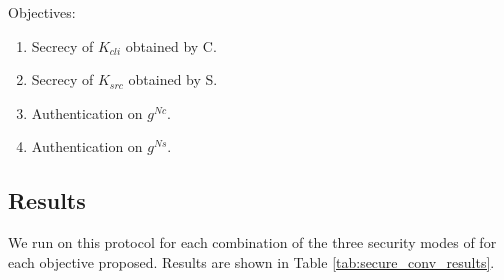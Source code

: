 Objectives:
\begin{enumerate}
    \item\label{item:sc_sec_cli} Secrecy of $K_{cli}$ obtained by C.
    \item\label{item:sc_sec_srv} Secrecy of $K_{src}$ obtained by S.
    \item\label{item:sc_auth_cli} Authentication on $g^{Nc}$.
    \item\label{item:sc_auth_srv} Authentication on $g^{Ns}$.
\end{enumerate}

\subsection{Results}

We run \proverif on this protocol for each combination of the three security
modes of \opcua for each objective proposed.
Results are shown in Table \ref{tab:secure_conv_results}.

